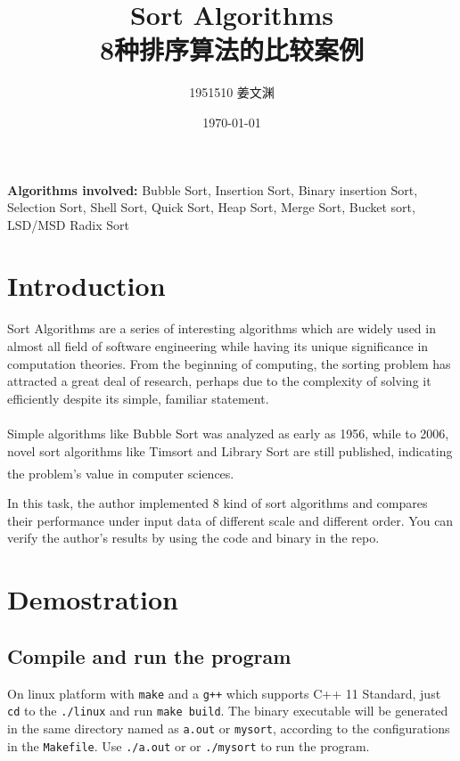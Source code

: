 \documentclass[cn,black,12pt,normal]{elegantnote}
\title{Sort Algorithms\\8种排序算法的比较案例 }
\author{1951510\; 姜文渊}
\institute{\small \url{https://github.com/jwyjohn/Jwy_DataStructureHomework}}
\date{\today}
\newcommand{\uct}[1]{\textsuperscript{\textsuperscript{\cite{#1}}}}
\begin{document}
\maketitle

\textbf{Algorithms involved:} Bubble Sort, Insertion Sort, Binary insertion Sort, Selection Sort, Shell Sort, Quick Sort, Heap Sort, Merge Sort, Bucket sort, LSD/MSD Radix Sort

\tableofcontents

\newpage

\section{Introduction}

Sort Algorithms are a series of interesting algorithms which are widely used in almost all field of software engineering while having its unique significance in computation theories. From the beginning of computing, the sorting problem has attracted a great deal of research, perhaps due to the complexity of solving it efficiently despite its simple, familiar statement.

Simple algorithms like Bubble Sort was analyzed as early as 1956\uct{demuth1957electronic}, while to 2006, novel sort algorithms like Timsort and Library Sort are still published, indicating the problem's value in computer sciences.\uct{auger2015merge}

In this task, the author implemented 8 kind of sort algorithms and compares their performance under input data of different scale and different order. You can verify the author's results by using the code and binary in the repo.

\section{Demostration}

\subsection{Compile and run the program}

On linux platform with \lstinline{make} and a \lstinline{g++} which supports C++ 11 Standard, just \lstinline{cd} to the \lstinline{./linux} and run \lstinline{make build}. The binary executable will be generated in the same directory named as \lstinline{a.out} or \lstinline{mysort}, according to the configurations in the \lstinline{Makefile}. Use \lstinline{./a.out} or or \lstinline{./mysort} to run the program.
\end{document}
